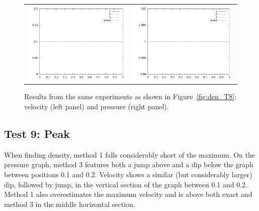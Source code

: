 \documentclass[10pt]{article}
\begin{document}
\begin{figure}
  \begin{center}
	\begin{tabular}{cc}
      \includegraphics[width=.475\textwidth]{vel_T8.png} &
	  \includegraphics[width=.475\textwidth]{prs_T8.png}
	\end{tabular}
  \end{center}
  \caption{Results from the same experiments as shown in Figure~\ref{fig:den_T8}:
  velocity (left panel) and pressure (right panel).}
\end{figure}

\clearpage

\subsection{Test 9: Peak}
When finding density, method 1 falls considerably short of the maximum. On the pressure graph, method 3 features both a jump above and a dip below the graph between positions 0.1 and 0.2. Velocity shows a similar (but considerably larger) dip, followed by jump, in the vertical section of the graph between 0.1 and 0.2. Method 1 also overestimates the maximum velocity and is above both exact and method 3 in the middle horizontal section. 
\end{document}
